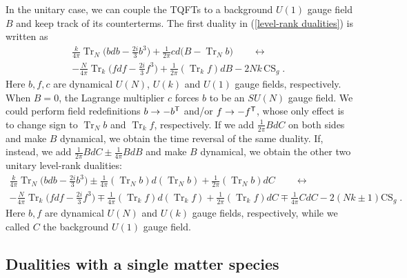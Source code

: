 \documentclass[a4paper, 12pt]{article}
\numberwithin{equation}{section}
\newcommand{\sT}{{\sf{T}}}
\DeclareMathOperator{\Tr}{Tr}
\begin{document}
In the unitary case, we can couple the TQFTs to a background $U(1)$ gauge field $B$ and keep track of its counterterms. The first duality in (\ref{level-rank dualities}) is
written as \cite{Hsin:2016blu}
\begin{multline}
\label{SU/U level-rank Lagrangian}
\frac k{4\pi} \Tr_N \Big( bdb - \frac{2i}3 b^3\Big) + \frac1{2\pi} cd\big( B - \Tr_N b \big) \qquad\longleftrightarrow\qquad \\
-\frac N{4\pi} \Tr_k \Big( fdf - \frac{2i}3 f^3\Big) + \frac1{2\pi} (\Tr_k f) dB - 2Nk \, \text{CS}_g \;.
\end{multline}
Here $b, f, c$ are dynamical $U(N)$, $U(k)$ and $U(1)$ gauge fields, respectively. When $B=0$, the Lagrange multiplier $c$ forces $b$ to be an $SU(N)$ gauge field. We could perform field redefinitions $b \to - b^\sT$ and/or $f \to - f^\sT$, whose only effect is to change sign to $\Tr_N b$ and $\Tr_k f$, respectively. If we add $\frac1{2\pi} BdC$ on both sides and make $B$ dynamical, we obtain the time reversal of the same duality. If, instead, we add $\frac1{2\pi} BdC \pm \frac1{4\pi} BdB$ and make $B$ dynamical, we obtain the other two unitary level-rank dualities:
\begin{multline}
\frac k{4\pi} \Tr_N \Big( bdb - \frac{2i}3 b^3\Big) \pm \frac1{4\pi} (\Tr_N b)d(\Tr_Nb) + \frac1{2\pi} (\Tr_Nb)dC \qquad\longleftrightarrow\qquad \\
-\frac N{4\pi} \Tr_k \Big( fdf - \frac{2i}3 f^3\Big) \mp \frac1{4\pi} (\Tr_k f)d(\Tr_k f) + \frac1{2\pi} (\Tr_k f) dC \mp \frac1{4\pi} CdC - 2(Nk\pm1) \text{CS}_g \;.
\end{multline}
Here $b,f$ are dynamical $U(N)$ and $U(k)$ gauge fields, respectively, while we called $C$ the background $U(1)$ gauge field.







\subsection{Dualities with a single matter species}
\end{document}

